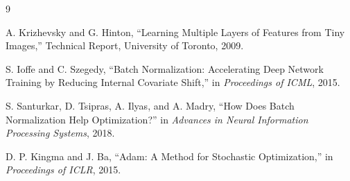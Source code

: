 \documentclass[UTF8,11pt,a4paper]{ctexart}
\begin{document}
\begin{thebibliography}{9}

A. Krizhevsky and G. Hinton,
\newblock ``Learning Multiple Layers of Features from Tiny Images,''
\newblock Technical Report, University of Toronto, 2009.

S. Ioffe and C. Szegedy,
\newblock ``Batch Normalization: Accelerating Deep Network Training by
Reducing Internal Covariate Shift,''
\newblock in \emph{Proceedings of ICML}, 2015.

S. Santurkar, D. Tsipras, A. Ilyas, and A. Madry,
\newblock ``How Does Batch Normalization Help Optimization?''
\newblock in \emph{Advances in Neural Information Processing Systems},
2018.

D. P. Kingma and J. Ba,
\newblock ``Adam: A Method for Stochastic Optimization,''
\newblock in \emph{Proceedings of ICLR}, 2015.

\end{thebibliography}
\end{document}
